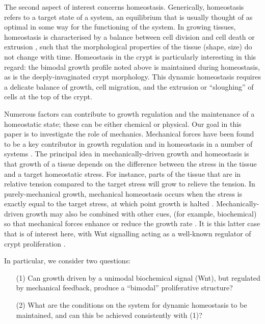 The second aspect of interest concerns homeostasis. Generically, homeostasis refers to a target state of a system, an equilibrium that is usually thought of as optimal in some way for the functioning of the system. In growing tissues, homeostasis is characterised by a balance between cell division and cell death or extrusion \cite{Anonymous:xgTthBz1}, such that the morphological properties of the tissue (shape, size) do not change with time.  Homeostasis in the crypt is particularly interesting in this regard: the bimodal growth profile noted above is maintained during homeostasis, as is the deeply-invaginated crypt morphology. This dynamic homeostasis requires a delicate balance of growth, cell migration, and the extrusion or ``sloughing'' of cells at the top of the crypt. 

Numerous factors can contribute to growth regulation and the maintenance of a homeostatic state; these can be either chemical or physical. Our goal in this paper is to investigate the role of mechanics. Mechanical forces have been found to be a key contributor in growth regulation and in homeostasis in a number of systems \cite{legoff2016mechanical}. The principal idea in mechanically-driven growth and homeostasis is that growth of a tissue depends on the difference between the stress in the tissue and a target homeostatic stress. For instance, parts of the tissue that are in relative tension compared to the target stress will grow to relieve the tension. In purely-mechanical growth, mechanical homeostasis occurs when the stress is exactly equal to the target stress, at which point growth is halted \cite{taber2009towards, erlich2019homeostatic}. Mechanically-driven growth may also be combined with other cues, (for example, biochemical) so that mechanical forces enhance or reduce the growth rate \cite{ERLICH:2018di}. It is this latter case that is of interest here, with Wnt signalling acting as a well-known regulator of crypt proliferation \cite{spit2018tales}.

In particular, we consider two questions: 
\begin{enumerate}
\item[(1)] Can growth driven by a unimodal biochemical signal (Wnt), but regulated by mechanical feedback, produce a ``bimodal'' proliferative structure?
\item[(2)] What are the conditions on the system for dynamic homeostasis to be maintained, and can this be achieved consistently with (1)?
\end{enumerate}

